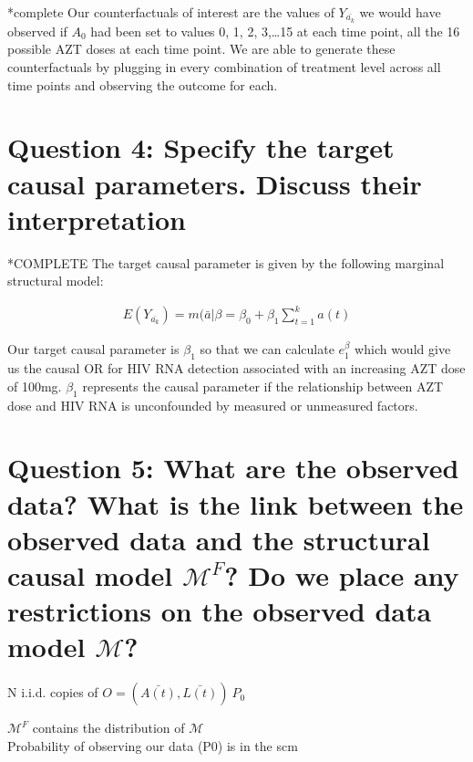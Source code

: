 \documentclass[]{article}
\begin{document}
*complete Our counterfactuals of interest are the values of
\(Y_{\bar{a_k}}\) we would have observed if \(A_0\) had been set to
values 0, 1, 2, 3,\ldots{}15 at each time point, all the 16 possible AZT
doses at each time point. We are able to generate these counterfactuals
by plugging in every combination of treatment level across all time
points and observing the outcome for each.

\section{Question 4: Specify the target causal parameters. Discuss their
interpretation}\label{question-4-specify-the-target-causal-parameters.-discuss-their-interpretation}

*COMPLETE The target causal parameter is given by the following marginal
structural model:

\begin{align}
E(Y_{\bar{a_k}})=m(\bar{a}|\beta= \beta_0 + \beta_1\sum_{t=1}^ka(t)
\end{align}

Our target causal parameter is \(\beta_1\) so that we can calculate
\(e^\beta_1\) which would give us the causal OR for HIV RNA detection
associated with an increasing AZT dose of 100mg. \(\beta_1\) represents
the causal parameter if the relationship between AZT dose and HIV RNA is
unconfounded by measured or unmeasured factors.

\section{\texorpdfstring{Question 5: What are the observed data? What is
the link between the observed data and the structural causal model
\(\mathcal{M}^F\)? Do we place any restrictions on the observed data
model
\(\mathcal{M}\)?}{Question 5: What are the observed data? What is the link between the observed data and the structural causal model \textbackslash{}mathcal\{M\}\^{}F? Do we place any restrictions on the observed data model \textbackslash{}mathcal\{M\}?}}\label{question-5-what-are-the-observed-data-what-is-the-link-between-the-observed-data-and-the-structural-causal-model-mathcalmf-do-we-place-any-restrictions-on-the-observed-data-model-mathcalm}

N i.i.d. copies of \(O=(\bar{A(t)}, \bar{L(t)})~P_0\)

\(\mathcal{M}^F\) contains the distribution of \(\mathcal{M}\)\\
Probability of observing our data (P0) is in the scm
\end{document}
